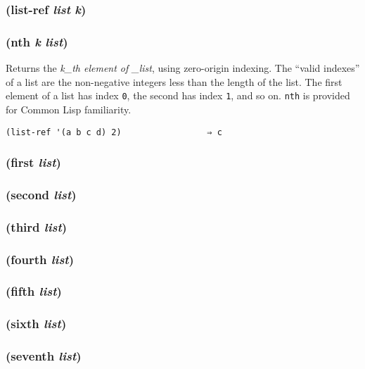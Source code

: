 \documentclass{article}
\begin{document}
\subsubsection{(list-ref \emph{list} \emph{k})}

\subsubsection{(nth \emph{k} \emph{list})}

Returns the \emph{k\_th element of \_list}, using zero-origin indexing. The ``valid indexes''
of a list are the non-negative integers less than the length of the list. The first element of
a list has index \verb|0|, the second has index \verb|1|, and so on. \verb|nth| is
provided for Common Lisp familiarity.

\begin{verbatim}
(list-ref '(a b c d) 2)                 ⇒ c
\end{verbatim}

\subsubsection{(first \emph{list})}

\subsubsection{(second \emph{list})}

\subsubsection{(third \emph{list})}

\subsubsection{(fourth \emph{list})}

\subsubsection{(fifth \emph{list})}

\subsubsection{(sixth \emph{list})}

\subsubsection{(seventh \emph{list})}
\end{document}
